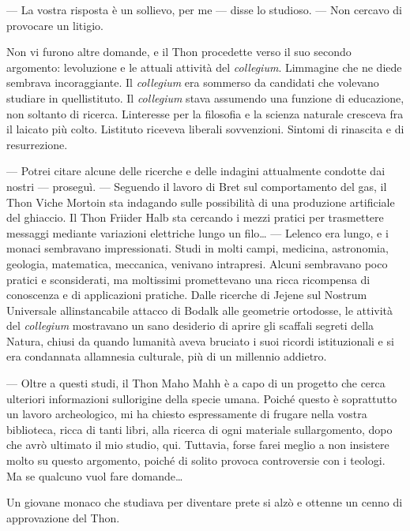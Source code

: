 --- La vostra risposta è un sollievo, per me --- disse lo studioso. ---
Non cercavo di provocare un litigio.

Non vi furono altre domande, e il Thon procedette verso il suo secondo
argomento: l\textquotesingle evoluzione e le attuali attività del
\emph{collegium}. L\textquotesingle immagine che ne diede sembrava
incoraggiante. Il \emph{collegium} era sommerso da candidati che
volevano studiare in quell\textquotesingle istituto. Il \emph{collegium}
stava assumendo una funzione di educazione, non soltanto di ricerca.
L\textquotesingle interesse per la filosofia e la scienza naturale
cresceva fra il laicato più colto. L\textquotesingle istituto riceveva
liberali sovvenzioni. Sintomi di rinascita e di resurrezione.

--- Potrei citare alcune delle ricerche e delle indagini attualmente
condotte dai nostri --- proseguì. --- Seguendo il lavoro di Bret sul
comportamento del gas, il Thon Viche Mortoin sta indagando sulle
possibilità di una produzione artificiale del ghiaccio. Il Thon Friider
Halb sta cercando i mezzi pratici per trasmettere messaggi mediante
variazioni elettriche lungo un filo\ldots{} --- L\textquotesingle elenco
era lungo, e i monaci sembravano impressionati. Studi in molti campi,
medicina, astronomia, geologia, matematica, meccanica, venivano
intrapresi. Alcuni sembravano poco pratici e sconsiderati, ma moltissimi
promettevano una ricca ricompensa di conoscenza e di applicazioni
pratiche. Dalle ricerche di Jejene sul Nostrum Universale
all\textquotesingle instancabile attacco di Bodalk alle geometrie
ortodosse, le attività del \emph{collegium} mostravano un sano desiderio
di aprire gli scaffali segreti della Natura, chiusi da quando
l\textquotesingle umanità aveva bruciato i suoi ricordi istituzionali e
si era condannata all\textquotesingle amnesia culturale, più di un
millennio addietro.

--- Oltre a questi studi, il Thon Maho Mahh è a capo di un progetto che
cerca ulteriori informazioni sull\textquotesingle origine della specie
umana. Poiché questo è soprattutto un lavoro archeologico, mi ha chiesto
espressamente di frugare nella vostra biblioteca, ricca di tanti libri,
alla ricerca di ogni materiale sull\textquotesingle argomento, dopo che
avrò ultimato il mio studio, qui. Tuttavia, forse farei meglio a non
insistere molto su questo argomento, poiché di solito provoca
controversie con i teologi. Ma se qualcuno vuol fare domande\ldots{}

Un giovane monaco che studiava per diventare prete si alzò e ottenne un
cenno di approvazione del Thon.

